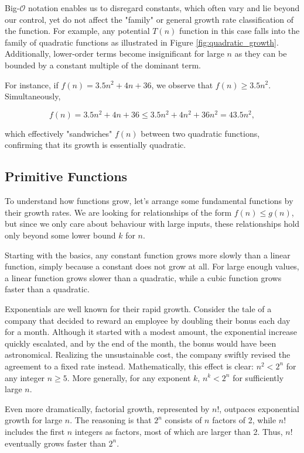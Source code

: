 Big-$\mathcal{O}$ notation enables us to disregard constants, which often vary and lie beyond our control, yet do not affect the "family" or general growth rate classification of the function. For example, any potential $T(n)$ function in this case falls into the family of quadratic functions as illustrated in Figure \ref{fig:quadratic_growth}. Additionally, lower-order terms become insignificant for large $n$ as they can be bounded by a constant multiple of the dominant term. 

For instance, if $f(n) = 3.5n^2 + 4n + 36$, we observe that $f(n) \geq 3.5n^2$. Simultaneously,

\[
f(n) = 3.5n^2 + 4n + 36 \leq 3.5n^2 + 4n^2 + 36n^2 = 43.5n^2,
\]

which effectively "sandwiches" $f(n)$ between two quadratic functions, confirming that its growth is essentially quadratic.

\subsection*{Primitive Functions}
To understand how functions grow, let’s arrange some fundamental functions by their growth rates. We are looking for relationships of the form \( f(n) \leq g(n) \), but since we only care about behaviour with large inputs, these relationships hold only beyond some lower bound \( k \) for \( n \).

Starting with the basics, any constant function grows more slowly than a linear function, simply because a constant does not grow at all. For large enough values, a linear function grows slower than a quadratic, while a cubic function grows faster than a quadratic.

Exponentials are well known for their rapid growth. Consider the tale of a company that decided to reward an employee by doubling their bonus each day for a month. Although it started with a modest amount, the exponential increase quickly escalated, and by the end of the month, the bonus would have been astronomical. Realizing the unsustainable cost, the company swiftly revised the agreement to a fixed rate instead. Mathematically, this effect is clear: \( n^2 < 2^n \) for any integer \( n \geq 5 \). More generally, for any exponent \( k \), \( n^k < 2^n \) for sufficiently large \( n \).

Even more dramatically, factorial growth, represented by \( n! \), outpaces exponential growth for large \( n \). The reasoning is that \( 2^n \) consists of \( n \) factors of 2, while \( n! \) includes the first \( n \) integers as factors, most of which are larger than 2. Thus, \( n! \) eventually grows faster than \( 2^n \). 

